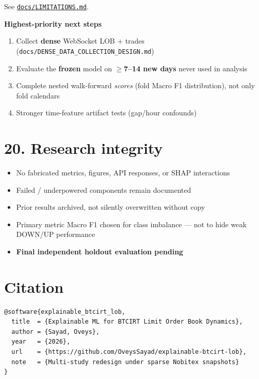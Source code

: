 \documentclass[11pt,a4paper]{article}
\begin{document}
See \href{docs/LIMITATIONS.md}{\texttt{docs/LIMITATIONS.md}}.


\textbf{Highest-priority next steps}


\begin{enumerate}
\item Collect \textbf{dense} WebSocket LOB + trades (\texttt{docs/DENSE\_DATA\_COLLECTION\_DESIGN.md})  
\item Evaluate the \textbf{frozen} model on \textbf{$\ge$7--14 new days} never used in analysis  
\item Complete nested walk-forward \textit{scores} (fold Macro F1 distribution), not only fold calendars  
\item Stronger time-feature artifact tests (gap/hour confounds)
\end{enumerate}

\vspace{0.5em}

\section{20. Research integrity}

\begin{itemize}
\item No fabricated metrics, figures, API responses, or SHAP interactions  
\item Failed / underpowered components remain documented  
\item Prior results archived, not silently overwritten without copy  
\item Primary metric Macro F1 chosen for class imbalance --- not to hide weak DOWN/UP performance  
\item \textbf{Final independent holdout evaluation pending}
\end{itemize}

\vspace{0.5em}

\section{Citation}

\begin{verbatim}
@software{explainable_btcirt_lob,
  title  = {Explainable ML for BTCIRT Limit Order Book Dynamics},
  author = {Sayad, Oveys},
  year   = {2026},
  url    = {https://github.com/OveysSayad/explainable-btcirt-lob},
  note   = {Multi-study redesign under sparse Nobitex snapshots}
}
\end{verbatim}
\end{document}
